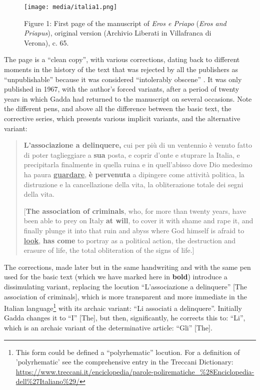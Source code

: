 \documentclass{article}
\begin{document}
\begin{figure}[H]
    \centering
    \texttt{[image: media/italia1.png]}    
    \caption{Figure 1: First page of the manuscript of \emph{Eros e Priapo} (\emph{Eros
and Priapus}), original version (Archivio Liberati in Villafranca di
Verona), c. 65.}
    \label{fig:italia1}
\end{figure}


The page is a ``clean copy'', with various corrections, dating back to
different moments in the history of the text that was rejected by all the publishers as ``unpublishable'' because it was considered ``intolerably obscene'' \parencite[46, letter from 28 October 1946]{gadda_lettere_1988}. It was only published in 1967, with the author's forced variants, after a period of twenty years in which Gadda had returned to the manuscript on several occasions. Note the different pens, and above all the difference
between the basic text, the corrective series, which presents various
implicit variants, and the alternative variant:

\begin{quote}
\textbf{L'associazione a delinquere,} cui per più di un ventennio è
venuto fatto di poter taglieggiare a \textbf{sua} posta, e coprir d'onte
e stuprare la Italia, e precipitarla finalmente in quella ruina e in
quell'abisso dove Dio medesimo ha paura \textbf{\uline{guardare}},
\textbf{è pervenuta} a dipingere come attività politica, la distruzione
e la cancellazione della vita, la obliterazione totale dei segni della
vita.

\vspace{1em}

[\textbf{The association of criminals}, who, for more than twenty years,
have been able to prey on Italy \textbf{at will}, to cover it with shame
and rape it, and finally plunge it into that ruin and abyss where God
himself is afraid to \textbf{\uline{look}}, \textbf{has come} to portray as a
political action, the destruction and erasure of life, the total
obliteration of the signs of life.]
\begin{flushright}
\parencite[11]{gadda_eros_2016}
\end{flushright}
\end{quote}

The corrections, made later but in the same handwriting and with the
same pen used for the basic text (which we have marked here in
\textbf{bold}) introduce a dissimulating variant, replacing the
locution ``L'associazione a delinquere''  [The association of
criminals], which is more transparent and more immediate in the Italian language\footnote{This form could be defined a ``polyrhematic'' locution. For a  definition of 'polyrhematic' see the comprehensive entry in the
  Treccani Dictionary:
  \url{https://www.treccani.it/enciclopedia/parole-polirematiche_\%28Enciclopedia-dell\%27Italiano\%29/}}
with its archaic variant: ``Li associati a delinquere''. Initially Gadda changes it to ``I'' [The], but then, significantly, he corrects this to: ``Li'', which is
an archaic variant of the determinative article: ``Gli'' [The].
\end{document}
